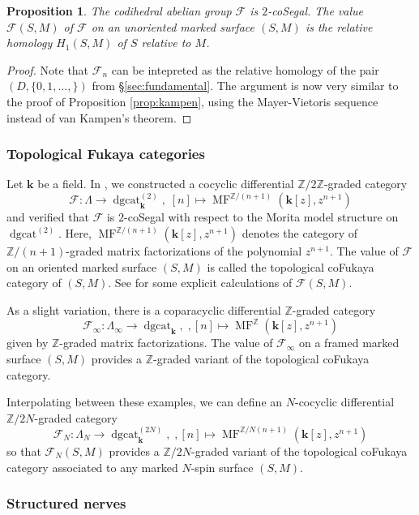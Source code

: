 \documentclass[english,11pt,leqno]{article}
\def\ZZ{\mathbb{Z}}
\def\scrF{\mathscr{F}}
\def\F{\scrF}
\def\on{\operatorname}
\def\lra{\longrightarrow}
\def\k{\mathbf{k}}
\def\Zt{\mathbb{Z}/2\mathbb{Z}}
\def\dgcat{\on{dgcat}}
\def\dgcatt{\dgcat^{(2)}}
\def\MF{\on{MF}}
\newtheorem{prop}[thm]{Proposition}
\theoremstyle{definition}
\theoremstyle{remark}
\numberwithin{equation}{section}
\begin{document}
\begin{prop} The codihedral abelian group $\F$ is $2$-coSegal. The value $\F(S,M)$ of $\F$ on an
	unoriented marked surface $(S,M)$ is the relative homology $H_1(S,M)$ of $S$ relative
	to $M$.
\end{prop}
\begin{proof} Note that $\F_n$ can be intepreted as the relative homology of the pair
	$(D,\{0,1,\dots,\})$ from \S \ref{sec:fundamental}. The argument is now very similar to the
	proof of Proposition \ref{prop:kampen}, using the Mayer-Vietoris sequence instead of van
	Kampen's theorem.
\end{proof}

\subsubsection{Topological Fukaya categories}

Let $\k$ be a field. In \cite{HSS-triangulated}, we constructed a cocyclic differential 
$\Zt$-graded category
\[
	\F: \Lambda \lra \dgcatt_{\k}, \; [n] \mapsto \MF^{\ZZ/(n+1)}(\k[z], z^{n+1})
\]
and verified that $\F$ is $2$-coSegal with respect to the Morita model structure on $\dgcatt$. Here,
$\MF^{\ZZ/(n+1)}(\k[z], z^{n+1})$ denotes the category of $\ZZ/(n+1)$-graded matrix factorizations
of the polynomial $z^{n+1}$.
The value of $\F$ on an oriented marked surface $(S,M)$ is called the topological coFukaya category
of $(S,M)$. See \cite{HSS-triangulated} for some explicit calculations of $\F(S,M)$.

As a slight variation, there is a coparacyclic differential $\ZZ$-graded category
\[
	\F_{\infty}: \Lambda_{\infty} \lra \dgcat_{\k}, \;,  [n] \mapsto \MF^{\ZZ}(\k[z], z^{n+1})
\]
given by $\ZZ$-graded matrix factorizations.
The value of $\F_{\infty}$ on a framed marked surface $(S,M)$ provides a $\ZZ$-graded variant of the
topological coFukaya category.

Interpolating between these examples, we can define an $N$-cocyclic differential $\ZZ/2N$-graded category
\[
	\F_{N}: \Lambda_{N} \lra \dgcat_{\k}^{(2N)}, \;,  [n] \mapsto \MF^{\ZZ/N(n+1)}(\k[z], z^{n+1})
\]
so that $\F_N(S,M)$ provides a $\ZZ/2N$-graded variant of the topological coFukaya category
associated to any marked $N$-spin surface $(S,M)$.

\subsubsection{Structured nerves}
\end{document}
